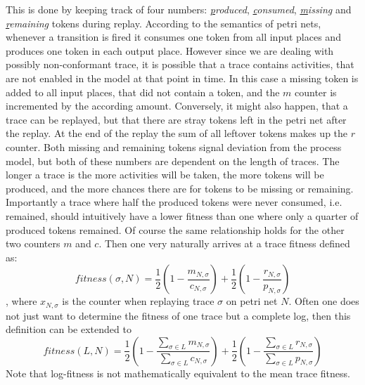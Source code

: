 \documentclass[runningheads]{template/llncs}
\begin{document}
This is done by keeping track of four numbers: \emph{\underline{p}roduced}, \emph{\underline{c}onsumed}, \emph{\underline{m}issing} and \emph{\underline{r}emaining} tokens during replay.
According to the semantics of petri nets, whenever a transition is fired it consumes one token from all input places and produces one token in each output place.
However since we are dealing with possibly non-conformant trace, it is possible that a trace contains activities, that are not enabled in the model at that point in time.
In this case a missing token is added to all input places, that did not contain a token, and the $m$ counter is incremented by the according amount.
Conversely, it might also happen, that a trace can be replayed, but that there are stray tokens left in the petri net after the replay. 
At the end of the replay the sum of all leftover tokens makes up the $r$ counter. 
Both missing and remaining tokens signal deviation from the process model, but both of these numbers are dependent on the length of traces.
The longer a trace is the more activities will be taken, the more tokens will be produced, and the more chances there are for tokens to be missing or remaining.
Importantly a trace where half the produced tokens were never consumed, i.e. remained, should intuitively have a lower fitness than one where only a quarter of produced tokens remained.
Of course the same relationship holds for the other two counters $m$ and $c$.
Then one very naturally arrives at a trace fitness defined as:
\begin{equation}
fitness(\sigma,N) = \frac{1}{2}(1-\frac{m_{N,\sigma}}{c_{N,\sigma}})+\frac{1}{2}(1-\frac{r_{N,\sigma}}{p_{N,\sigma}})
\end{equation}
, where $x_{N,\sigma}$ is the counter when replaying trace $\sigma$ on petri net $N$.
Often one does not just want to determine the fitness of one trace but a complete log, then this definition can be extended to 
\begin{equation}
	fitness(L,N) = \frac{1}{2}(1-\frac{\sum_{\sigma\in L}m_{N,\sigma}}{\sum_{\sigma\in L}c_{N,\sigma}})+\frac{1}{2}(1-\frac{\sum_{\sigma\in L}r_{N,\sigma}}{\sum_{\sigma\in L}p_{N,\sigma}})
\end{equation}
Note that log-fitness is not mathematically equivalent to the mean trace fitness.
\end{document}
